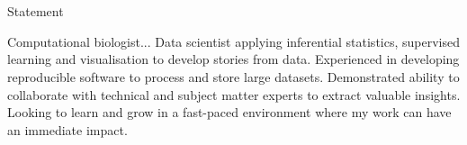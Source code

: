 \section{\faGears}{Statement}
 \vspace{3pt}
 \resumeEntryStart
  {\small Computational biologist... Data scientist applying inferential statistics, supervised learning and visualisation to develop stories from data. Experienced in developing reproducible software to process and store large datasets. Demonstrated ability to collaborate with technical and subject matter experts to extract valuable insights. Looking to learn and grow in a fast-paced environment where my work can have an immediate impact.\par}
 \resumeEntryEnd
